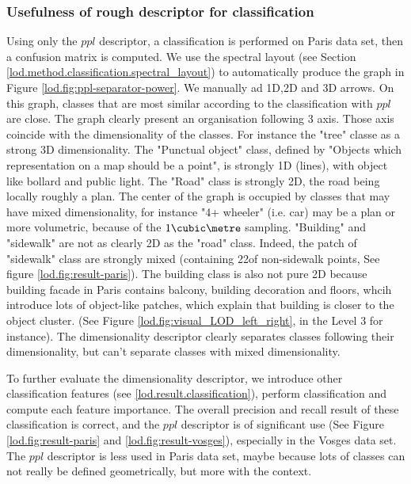   
		\subsubsection{Usefulness of rough descriptor for classification}
		
		Using only the $ppl$ descriptor, a classification is performed on Paris data set, then a confusion matrix is computed.
		We use the spectral layout (see Section \ref{lod.method.classification.spectral_layout}) to automatically produce the graph in Figure \ref{lod.fig:ppl-separator-power}. 
		We manually ad 1D,2D and 3D arrows.
		On this graph, classes that are most similar according to the classification with $ppl$ are close. The graph clearly present an organisation following 3 axis. Those axis coincide with the dimensionality of the classes. For instance the "tree" classe as a strong 3D dimensionality. The "Punctual object" class, defined by "Objects which representation on a map should be a point", is strongly 1D (lines), with object like bollard and public light. The "Road" class is strongly 2D, the road being locally roughly a plan. The center of the graph is occupied by classes that may have mixed dimensionality, for instance "4+ wheeler" (i.e. car) may be a plan or more volumetric, because of the $1 \cubic \metre$ sampling.
		"Building" and "sidewalk" are not as clearly 2D as  the "road" class. Indeed, the patch of "sidewalk" class are strongly mixed (containing 22\mypercent of non-sidewalk points, See figure \ref{lod.fig:result-paris}). The building class is also not pure 2D because building facade in Paris contains balcony, building decoration and floors, whcih introduce lots of object-like patches, which explain that building is closer to the object cluster. (See Figure \ref{lod.fig:visual_LOD_left_right}, in the Level 3 for instance).
		The dimensionality descriptor clearly separates classes following their dimensionality, but can't separate classes with mixed dimensionality.
		
		
		To further evaluate the dimensionality descriptor, we introduce other classification features (see \ref{lod.result.classification}), perform classification and compute each feature importance.
		The overall precision and recall result of these classification is correct, and the $ppl$ descriptor is of significant use (See Figure \ref{lod.fig:result-paris} and \ref{lod.fig:result-vosges}), especially in the Vosges data set. The $ppl$ descriptor is less used in Paris data set, maybe because lots of classes can not really be defined geometrically, but more with the context.
		  
